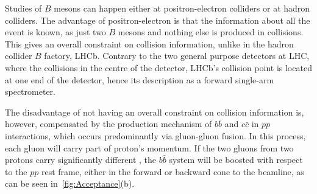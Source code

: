 Studies of $B$ mesons can happen either at positron-electron colliders or at hadron colliders. The advantage of positron-electron \DIFdelbegin {}\DIFdelend \DIFaddbegin {}\DIFaddend is that the information about all the event is known, as just two $B$ mesons and nothing else is produced in \DIFaddbegin {}\DIFaddend collisions. This gives an overall constraint on collision information, unlike in the hadron collider $B$ factory, \gls{LHCb}. Contrary to the two general purpose detectors at \gls{LHC}, where the collisions \DIFdelbegin {}\DIFdelend \DIFaddbegin {}\DIFaddend in the centre of the detector, \Gls{LHCb}'s collision point is located at one end of the detector, hence its description as a forward single-arm spectrometer. 

The disadvantage of not having an overall constraint on collision information is, however, compensated by the production mechanism of $b\bar{b}$ and $c\bar{c}$ in $pp$ interactions, which occurs predominantly via gluon-gluon fusion. In this process, each gluon will carry part of proton's momentum. If the two gluons from two protons carry significantly different \DIFdelbegin {}\DIFdelend \DIFaddbegin {}\DIFaddend , the $b\bar{b}$ system will be boosted with respect to the $pp$ rest frame, either in the forward or backward cone \DIFdelbegin {}\DIFdelend \DIFaddbegin {}\DIFaddend to the beamline, as can be seen in~\autoref{fig:Acceptance}(b).


